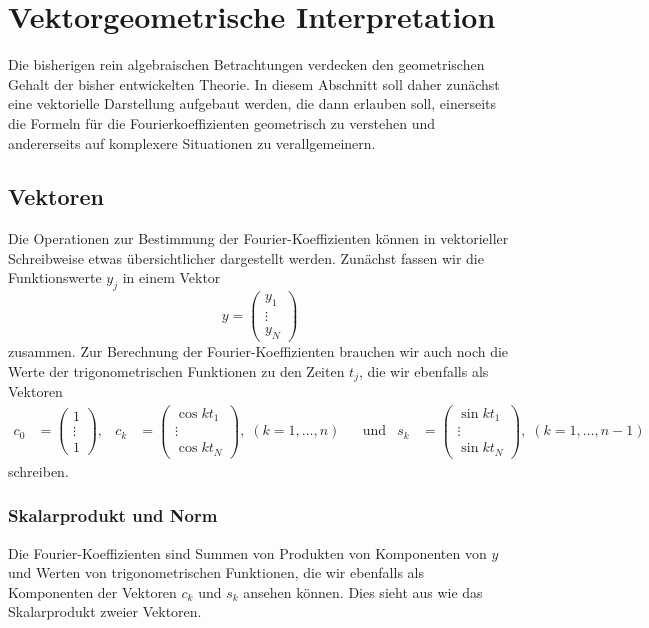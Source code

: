 %
%
%
\section{Vektorgeometrische Interpretation}
Die bisherigen rein algebraischen Betrachtungen verdecken den geometrischen
Gehalt der bisher entwickelten Theorie.
In diesem Abschnitt soll daher zunächst eine vektorielle Darstellung
aufgebaut werden, die dann erlauben soll, einerseits die Formeln für die 
Fourierkoeffizienten geometrisch zu verstehen und andererseits auf
komplexere Situationen zu verallgemeinern.

\subsection{Vektoren}
Die Operationen zur Bestimmung der Fourier-Koeffizienten können in 
vektorieller Schreibweise etwas übersichtlicher dargestellt werden.
Zunächst fassen wir die Funktionswerte $y_j$ in einem Vektor
\begin{equation}
y = \begin{pmatrix}y_1\\\vdots\\y_N\end{pmatrix}
\end{equation}
zusammen.
Zur Berechnung der Fourier-Koeffizienten brauchen wir auch noch die
Werte der trigonometrischen Funktionen zu den Zeiten $t_j$, die wir
ebenfalls als Vektoren
\begin{align*}
c_0&=\begin{pmatrix}1\\\vdots\\1\end{pmatrix},
&
c_k&=\begin{pmatrix}\cos kt_1\\\vdots\\\cos kt_N\end{pmatrix},\;(k=1,\dots,n)
&&\text{und}
&
s_k&=\begin{pmatrix}\sin kt_1\\\vdots\\\sin kt_N\end{pmatrix},\;(k=1,\dots,n-1)
\end{align*}
schreiben.

\subsubsection{Skalarprodukt und Norm}
Die Fourier-Koeffizienten sind Summen von Produkten von Komponenten von $y$
und Werten von trigonometrischen Funktionen, die wir ebenfalls als Komponenten
der Vektoren $c_k$ und $s_k$ ansehen können.
Dies sieht aus wie das Skalarprodukt zweier Vektoren.

